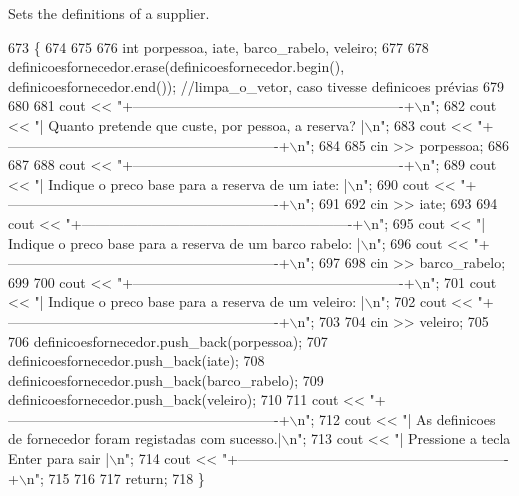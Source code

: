 Sets the definitions of a supplier. 


\begin{DoxyCode}
673                                          \{
674 
675 
676     \textcolor{keywordtype}{int} porpessoa, iate, barco\_rabelo, veleiro;
677 
678     definicoesfornecedor.erase(definicoesfornecedor.begin(), definicoesfornecedor.end()); \textcolor{comment}{//limpa\_o\_vetor,
       caso tivesse definicoes prévias}
679 
680 
681     cout << \textcolor{stringliteral}{"+----------------------------------------------------------+\(\backslash\)n"};
682     cout << \textcolor{stringliteral}{"| Quanto pretende que custe, por pessoa, a reserva?        |\(\backslash\)n"};
683     cout << \textcolor{stringliteral}{"+----------------------------------------------------------+\(\backslash\)n"};
684 
685     cin >> porpessoa;
686 
687 
688     cout << \textcolor{stringliteral}{"+----------------------------------------------------------+\(\backslash\)n"};
689     cout << \textcolor{stringliteral}{"| Indique o preco base para a reserva de um iate:          |\(\backslash\)n"};
690     cout << \textcolor{stringliteral}{"+----------------------------------------------------------+\(\backslash\)n"};
691 
692     cin >> iate;
693 
694     cout << \textcolor{stringliteral}{"+----------------------------------------------------------+\(\backslash\)n"};
695     cout << \textcolor{stringliteral}{"| Indique o preco base para a reserva de um barco rabelo:  |\(\backslash\)n"};
696     cout << \textcolor{stringliteral}{"+----------------------------------------------------------+\(\backslash\)n"};
697 
698     cin >> barco\_rabelo;
699 
700     cout << \textcolor{stringliteral}{"+----------------------------------------------------------+\(\backslash\)n"};
701     cout << \textcolor{stringliteral}{"| Indique o preco base para a reserva de um veleiro:       |\(\backslash\)n"};
702     cout << \textcolor{stringliteral}{"+----------------------------------------------------------+\(\backslash\)n"};
703 
704     cin >> veleiro;
705     
706     definicoesfornecedor.push\_back(porpessoa);
707     definicoesfornecedor.push\_back(iate);
708     definicoesfornecedor.push\_back(barco\_rabelo);
709     definicoesfornecedor.push\_back(veleiro);
710 
711     cout << \textcolor{stringliteral}{"+----------------------------------------------------------+\(\backslash\)n"};
712     cout << \textcolor{stringliteral}{"| As definicoes de fornecedor foram registadas com sucesso.|\(\backslash\)n"};
713     cout << \textcolor{stringliteral}{"| Pressione a tecla Enter para sair                        |\(\backslash\)n"};
714     cout << \textcolor{stringliteral}{"+----------------------------------------------------------+\(\backslash\)n"};
715 
716 
717     \textcolor{keywordflow}{return};
718 \}
\end{DoxyCode}


